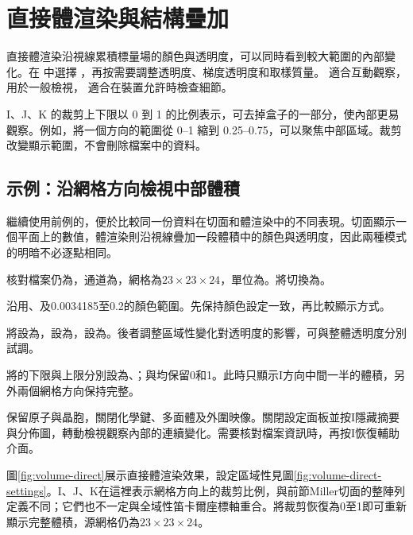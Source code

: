 \section{直接體渲染與結構疊加}

直接體渲染沿視線累積標量場的顏色與透明度，可以同時看到較大範圍的內部變化。在 中選擇 ，再按需要調整透明度、梯度透明度和取樣質量。 適合互動觀察， 用於一般檢視， 適合在裝置允許時檢查細節。

I、J、K 的裁剪上下限以 0 到 1 的比例表示，可去掉盒子的一部分，使內部更易觀察。例如，將一個方向的範圍從 0--1 縮到 0.25--0.75，可以聚焦中部區域。裁剪改變顯示範圍，不會刪除檔案中的資料。

\subsection{示例：沿網格方向檢視中部體積}

繼續使用前例的，便於比較同一份資料在切面和體渲染中的不同表現。切面顯示一個平面上的數值，體渲染則沿視線疊加一段體積中的顏色與透明度，因此兩種模式的明暗不必逐點相同。

\begin{steps}
  \item 核對檔案仍為，通道為，網格為$23\times23\times24$，單位為。將切換為。
  \item 沿用、及0.0034185至0.2的顏色範圍。先保持顏色設定一致，再比較顯示方式。
  \item 將設為，設為，設為。後者調整區域性變化對透明度的影響，可與整體透明度分別試調。
  \item 將的下限與上限分別設為、；與均保留0和1。此時只顯示I方向中間一半的體積，另外兩個網格方向保持完整。
  \item 保留原子與晶胞，關閉化學鍵、多面體及外圍映像。關閉設定面板並按I隱藏摘要與分佈圖，轉動檢視觀察內部的連續變化。需要核對檔案資訊時，再按I恢復輔助介面。
\end{steps}

圖\ref{fig:volume-direct}展示直接體渲染效果，設定區域性見圖\ref{fig:volume-direct-settings}。I、J、K在這裡表示網格方向上的裁剪比例，與前節Miller切面的整陣列定義不同；它們也不一定與全域性笛卡爾座標軸重合。將裁剪恢復為0至1即可重新顯示完整體積，源網格仍為$23\times23\times24$。


